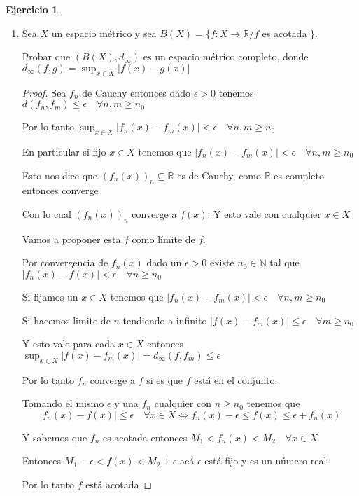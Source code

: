 \documentclass[11pt]{report}
\newcommand{\R}{\mathbb{R}}
\newcommand{\N}{\mathbb{N}}
\newcommand{\ra}{\rightarrow}
\theoremstyle{definition}
\newtheorem{ej}{Ejercicio}
\begin{document}
	\begin{ej}
		\begin{enumerate}
			\item Sea $X$ un espacio métrico y sea $B(X) = \{f: X\ra \R / f $ es acotada $\}$. 

				Probar que $(B(X),d_{\infty})$ es un espacio métrico completo, donde $d_{\infty}(f,g) = \sup_{x\in X}|f(x)-g(x)|$

				\begin{proof}
					Sea $f_n$ de Cauchy entonces dado $\epsilon >0$ tenemos $d(f_n,f_m) \leq \epsilon \quad \forall n,m\geq n_0$	

					Por lo tanto $\sup_{x\in X}|f_n(x) - f_m(x)| < \epsilon \quad \forall n,m \geq n_0$

					En particular si fijo $x \in X$ tenemos que $|f_n(x) - f_m(x)| < \epsilon \quad \forall n,m \geq n_0$

					Esto nos dice que $(f_n(x))_n \subseteq \R$ es de Cauchy, como $\R$ es completo entonces converge

					Con lo cual $(f_n(x))_n$ converge a $f(x)$. Y esto vale con cualquier $x \in X$ 

					Vamos a proponer esta $f$ como límite de $f_n$

					Por convergencia de $f_n(x)$ dado un $\epsilon >0$ existe $n_0 \in \N$ tal que $|f_n(x) - f(x)| < \epsilon \quad \forall n \geq n_0$

					Si fijamos un $x \in X$ tenemos que $|f_n(x)-f_m(x)| < \epsilon \quad \forall n,m\geq n_0$

					Si hacemos limite de $n$ tendiendo a infinito $|f(x) - f_m(x)| \leq \epsilon \quad \forall m \geq n_0$

					Y esto vale para cada $x \in X$ entonces $\sup_{x\in X}|f(x)-f_m(x)| = d_{\infty}(f,f_m) \leq \epsilon$

					Por lo tanto $f_n$ converge a $f$ si es que $f$ está en el conjunto.

					Tomando el mismo $\epsilon$ y una $f_n$ cualquier con $n \geq n_0$ tenemos que 
					$$|f_n(x) - f(x)| \leq \epsilon \quad \forall x \in X \iff f_n(x) - \epsilon \leq f(x) \leq \epsilon + f_n(x)$$

					Y sabemos que $f_n$ es acotada entonces $M_1< f_n(x) < M_2 \quad \forall x \in X$

					Entonces $M_1 - \epsilon < f(x) < M_2 + \epsilon $ acá $\epsilon$ está fijo y es un número real.

					Por lo tanto $f$ está acotada
				\end{proof}
				

\end{enumerate}
\end{ej}
\end{document}
